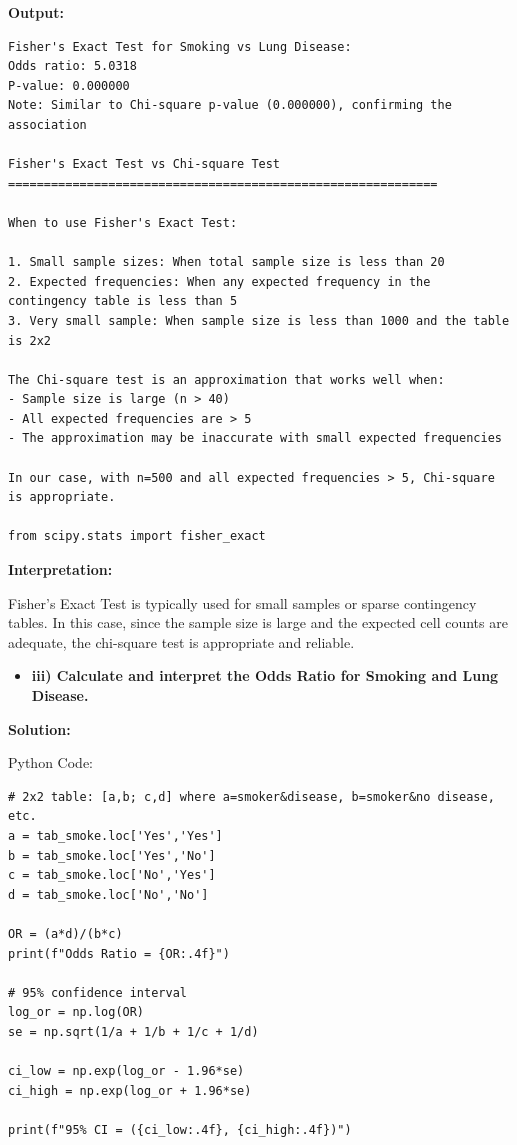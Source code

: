 \documentclass[12pt]{article}
\begin{document}
\textbf{Output:}

\vspace{0.3cm}

\begin{verbatim}
Fisher's Exact Test for Smoking vs Lung Disease:
Odds ratio: 5.0318
P-value: 0.000000
Note: Similar to Chi-square p-value (0.000000), confirming the association

Fisher's Exact Test vs Chi-square Test
============================================================

When to use Fisher's Exact Test:

1. Small sample sizes: When total sample size is less than 20
2. Expected frequencies: When any expected frequency in the contingency table is less than 5
3. Very small sample: When sample size is less than 1000 and the table is 2x2

The Chi-square test is an approximation that works well when:
- Sample size is large (n > 40)
- All expected frequencies are > 5
- The approximation may be inaccurate with small expected frequencies

In our case, with n=500 and all expected frequencies > 5, Chi-square is appropriate.

from scipy.stats import fisher_exact

\end{verbatim}

\vspace{0.4cm}

\textbf{Interpretation:}

Fisher’s Exact Test is typically used for small samples or sparse contingency tables. In this case, since the sample size is large and the expected cell counts are adequate, the chi-square test is appropriate and reliable.

\vspace{4cm}

\begin{itemize}
    \item\textbf{iii) Calculate and interpret the Odds Ratio for Smoking and Lung Disease.}
\end{itemize}

{\large\textbf{Solution:}}

\vspace{0.1cm}

{\large{Python Code:}}

\vspace{0.2cm}

\begin{verbatim}
# 2x2 table: [a,b; c,d] where a=smoker&disease, b=smoker&no disease, etc.
a = tab_smoke.loc['Yes','Yes']
b = tab_smoke.loc['Yes','No']
c = tab_smoke.loc['No','Yes']
d = tab_smoke.loc['No','No']

OR = (a*d)/(b*c)
print(f"Odds Ratio = {OR:.4f}")

# 95% confidence interval
log_or = np.log(OR)
se = np.sqrt(1/a + 1/b + 1/c + 1/d)

ci_low = np.exp(log_or - 1.96*se)
ci_high = np.exp(log_or + 1.96*se)

print(f"95% CI = ({ci_low:.4f}, {ci_high:.4f})")
\end{verbatim}
\end{document}

